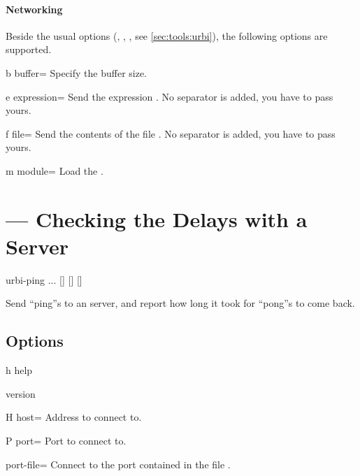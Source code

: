 \paragraph{Networking}
Beside the usual options (, ,
, see \autoref{sec:tools:urbi}), the following options
are supported.
\begin{options}
\item[b]{buffer=} Specify the buffer size.
\end{options}

\begin{options}[Input]
\item[e]{expression=} Send the \us expression .
  No separator is added, you have to pass yours.
\item[f]{file=} Send the contents of the file .
  No separator is added, you have to pass yours.
\item[m]{module=} Load the \UObject {}.
\end{options}

\section{ --- Checking the Delays with a Server}
\label{sec:tools:urbi-ping}

\begin{shell}
urbi-ping ... [] [] []
\end{shell}

Send ``ping''s to an \urbi server, and report how long it took for ``pong''s
to come back.

\subsection{Options}

\begin{options}
\item[h]{help} \optionHelp
\item{version} \optionVersion
\end{options}

\begin{options}[Networking]
\item[H]{host=} Address to connect to.
\item[P]{port=} Port to connect to.
\item{port-file=} Connect to the port contained in the file
  .
\end{options}

